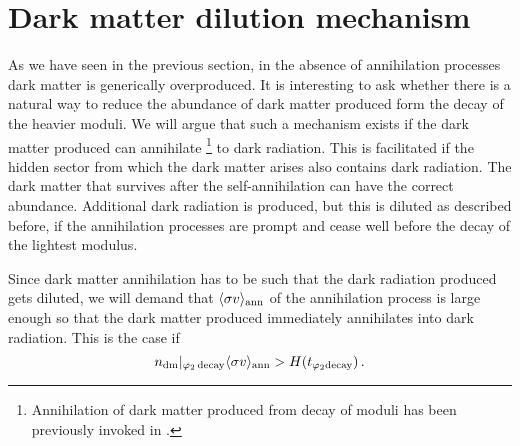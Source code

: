 \documentclass[12pt]{article}
\numberwithin{equation}{section}
\begin{document}
 
\section{Dark matter dilution mechanism}
\label{dmdilm}

As we have seen in the previous section, in the absence of annihilation processes  dark matter  is generically overproduced.
It is interesting to ask whether there is a natural way to reduce the abundance of dark matter produced form the decay of the heavier
moduli. 
%
We will argue that such a mechanism exists if the dark matter produced can annihilate \footnote{Annihilation of dark matter produced from decay of moduli
has been previously invoked in \cite{ann, pk}.} to dark radiation. This is facilitated if the hidden sector from which the dark matter arises also contains dark radiation. 
The dark matter  that survives after the self-annihilation can have the correct abundance. Additional dark radiation is produced, but this is diluted 
as described before, if the annihilation processes are prompt and cease well before the decay of the lightest modulus.


 Since dark matter annihilation has to be such that the dark radiation produced gets diluted, we will demand that
 $\langle\sigma v\rangle_{\rm{ann}}$ of the annihilation process is large enough so that the dark matter produced immediately
 annihilates into dark radiation. This is the case if 
%
\begin{equation}
\label{condii}
n_{\rm dm}|_ {\varphi_2 \, {\rm decay}} \langle\sigma v \rangle_{\rm{ann}} > H(t_{\varphi_{\rm 2} \rm{decay}}) \,.
\end{equation}
\end{document}

